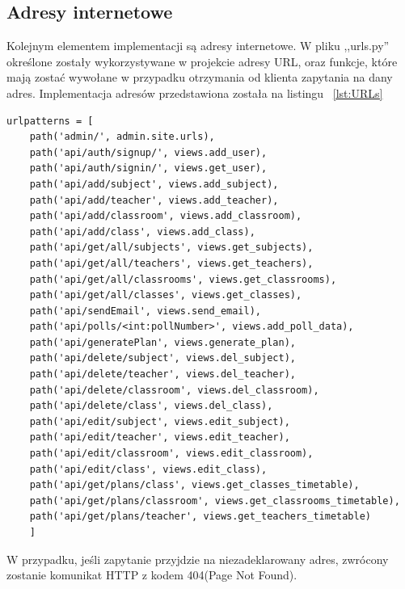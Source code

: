 \subsection{Adresy internetowe}
Kolejnym elementem implementacji są adresy internetowe. W pliku ,,urls.py'' określone zostały wykorzystywane w projekcie adresy URL, oraz funkcje, które mają zostać wywołane w przypadku otrzymania od klienta zapytania na dany adres. Implementacja adresów przedstawiona została na listingu ~\ref{lst:URLs}
\begin{lstlisting}[caption=Implementacja adresów URL, label={lst:URLs}]
	urlpatterns = [
	path('admin/', admin.site.urls),
	path('api/auth/signup/', views.add_user),
	path('api/auth/signin/', views.get_user),
	path('api/add/subject', views.add_subject),
	path('api/add/teacher', views.add_teacher),
	path('api/add/classroom', views.add_classroom),
	path('api/add/class', views.add_class),
	path('api/get/all/subjects', views.get_subjects),
	path('api/get/all/teachers', views.get_teachers),
	path('api/get/all/classrooms', views.get_classrooms),
	path('api/get/all/classes', views.get_classes),
	path('api/sendEmail', views.send_email),
	path('api/polls/<int:pollNumber>', views.add_poll_data),
	path('api/generatePlan', views.generate_plan),
	path('api/delete/subject', views.del_subject),
	path('api/delete/teacher', views.del_teacher),
	path('api/delete/classroom', views.del_classroom),
	path('api/delete/class', views.del_class),
	path('api/edit/subject', views.edit_subject),
	path('api/edit/teacher', views.edit_teacher),
	path('api/edit/classroom', views.edit_classroom),
	path('api/edit/class', views.edit_class),
	path('api/get/plans/class', views.get_classes_timetable),
	path('api/get/plans/classroom', views.get_classrooms_timetable),
	path('api/get/plans/teacher', views.get_teachers_timetable)
	]
\end{lstlisting}
W przypadku, jeśli zapytanie przyjdzie na niezadeklarowany adres, zwrócony zostanie komunikat HTTP z kodem 404(Page Not Found).

